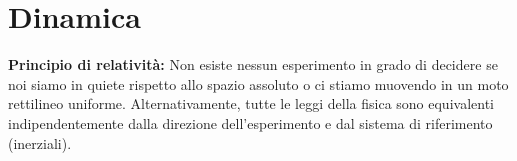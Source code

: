 \documentclass[a4paper]{article}
\begin{document}
%


\pagebreak

\section{Dinamica}

\textbf{Principio di relatività:}
Non esiste nessun esperimento in grado di decidere se noi siamo in quiete rispetto allo spazio assoluto
o ci stiamo muovendo in un moto rettilineo uniforme. Alternativamente, tutte le leggi della fisica sono equivalenti
indipendentemente dalla direzione dell'esperimento e dal sistema di riferimento (inerziali).
\end{document}

